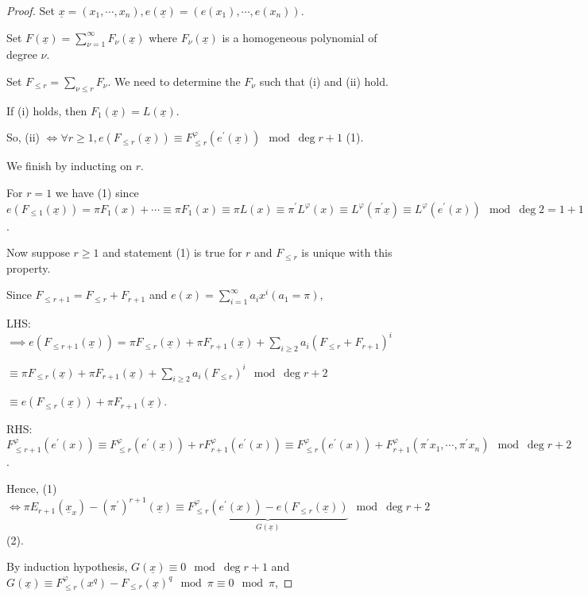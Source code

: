 \documentclass[openany]{amsbook}
\numberwithin{section}{chapter}
\theoremstyle{definition}
\begin{document}
\begin{proof}
    Set \(\underline{x} = (x_1, \cdots , x_n), e(\underline{x}) = (e(x_1), \cdots , e(x_n))\).

    Set \(F(\underline{x}) = \sum_{\nu=1}^{\infty} F_\nu(\underline{x})\) where \(F_\nu(\underline{x})\) is a homogeneous polynomial of degree \(\nu\).
    
    Set \(F_{\leq r} = \sum_{\nu\leq r} F_\nu\). We need to determine the \(F_\nu\) such that (i) and (ii) hold.

    If (i) holds, then \(F_1(\underline{x}) = L(\underline{x})\).
    
    So, (ii) \(\iff \forall r\geq 1, e(F_{\leq r}(\underline{x})) \equiv F^{\varphi}_{\leq r}(e^{\prime}(\underline{x}))\mod\deg{r+1}\) (1).
    
    We finish by inducting on \(r\).

    For \(r=1\) we have (1) since \(e(F_{\leq 1}(\underline{x})) = \pi F_1 (x) + \cdots \equiv \pi F_1(x) \equiv \pi L(x) \equiv \pi^{\prime} L^{\varphi} (x) \equiv L^{\varphi}(\pi^{\prime} \underline{x}) \equiv L^{\varphi} (e^{\prime} (x)) \mod \deg 2 = 1 + 1\).
    
    Now suppose \(r \geq 1\) and statement (1) is true for \(r\) and \(F_{\leq r}\) is unique with this property.

    Since \(F_{\leq r+1} = F_{\leq r} + F_{r+1}\) and \(e(x) = \sum_{i=1}^{\infty} a_i x^i (a_1 = \pi)\),

    LHS: \(\implies e(F_{\leq r+1}(\underline{x})) = \pi F_{\leq r}(\underline{x}) + \pi F_{r+1}(\underline{x}) + \sum_{i\geq 2} a_i(F_{\leq r} + F_{r+1})^i \)
    
    \(\equiv \pi F_{\leq r}(\underline{x}) + \pi F_{r+1}(\underline{x}) + \sum_{i\geq 2} a_i (F_{\leq r})^i \mod \deg r+2\)

    \(\equiv e(F_{\leq r}(\underline{x}))+\pi F_{r+1}(\underline{x})\). 

    RHS: \(F^{\varphi}_{\leq r+1}(e^{\prime} (x)) \equiv F^{\varphi}_{\leq r}(e^{\prime} (\underline{x})) + rF^{\varphi}_{r+1}(e^{\prime}(x)) \equiv F^{\varphi}_{\leq r} (e^{\prime} (x))+F_{r+1}^{\varphi}(\pi^{\prime} x_1, \cdots , \pi^{\prime} x_n) \mod\deg r+2 \).

    Hence, (1) \(\iff \pi E_{r+1}(\underline{x}_x) - (\pi^{\prime})^{r+1}(\underline{x}) \equiv \underbrace{F^{\varphi}_{\leq r}(e^{\prime}(x))- e(F_{\leq r}(\underline{x}))}_{G(\underline{x})} \mod \deg r+2 \) (2).
    
    By induction hypothesis, \(G(\underline{x}) \equiv 0 \mod\deg r+1\) and \(G(\underline{x}) \equiv F^{\varphi}_{\leq r}(x^q) - F_{\leq r}(\underline{x})^q \mod \pi \equiv 0\mod \pi\),  
    

\end{proof}
\end{document}
